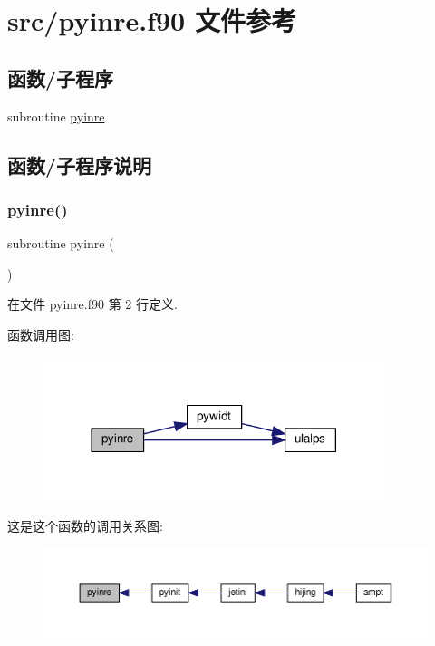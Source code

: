 \hypertarget{pyinre_8f90}{}\section{src/pyinre.f90 文件参考}
\label{pyinre_8f90}
\subsection*{函数/子程序}
\begin{DoxyCompactItemize}
\item 
subroutine \mbox{\hyperlink{pyinre_8f90_a6fa4e6a261de929c41d509ff9aadde33}{pyinre}}
\end{DoxyCompactItemize}


\subsection{函数/子程序说明}
\mbox{\label{pyinre_8f90_a6fa4e6a261de929c41d509ff9aadde33}} 
\subsubsection{\texorpdfstring{pyinre()}{pyinre()}}
{\footnotesize\ttfamily subroutine pyinre (\begin{DoxyParamCaption}{ }\end{DoxyParamCaption})}



在文件 pyinre.\+f90 第 2 行定义.

函数调用图\+:
\nopagebreak
\begin{figure}[H]
\begin{center}
\leavevmode
\includegraphics[width=282pt]{pyinre_8f90_a6fa4e6a261de929c41d509ff9aadde33_cgraph}
\end{center}
\end{figure}
这是这个函数的调用关系图\+:
\nopagebreak
\begin{figure}[H]
\begin{center}
\leavevmode
\includegraphics[width=350pt]{pyinre_8f90_a6fa4e6a261de929c41d509ff9aadde33_icgraph}
\end{center}
\end{figure}
